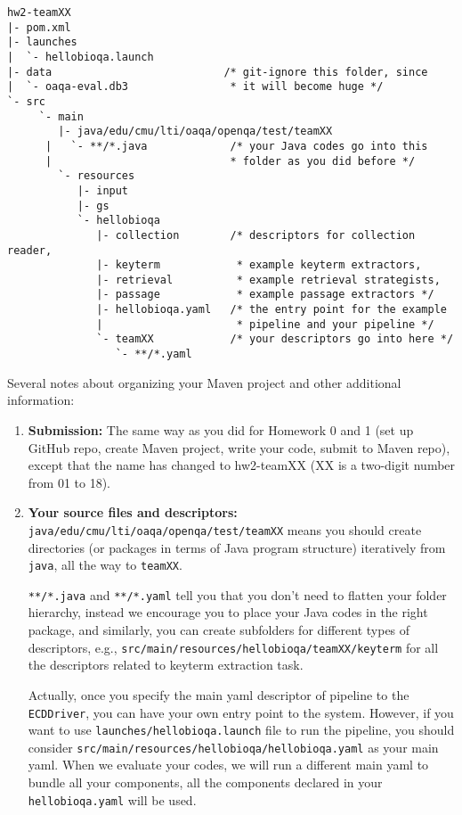 \documentclass[oneside]{memoir}
\begin{document}
\begin{titlingpage}
\begin{minipage}{1.2\textwidth}
\small
\begin{verbatim}
hw2-teamXX
|- pom.xml
|- launches
|  `- hellobioqa.launch
|- data                           /* git-ignore this folder, since
|  `- oaqa-eval.db3                * it will become huge */
`- src
     `- main
        |- java/edu/cmu/lti/oaqa/openqa/test/teamXX
      |   `- **/*.java             /* your Java codes go into this 
      |                            * folder as you did before */
        `- resources
           |- input
           |- gs
           `- hellobioqa
              |- collection        /* descriptors for collection reader,
              |- keyterm            * example keyterm extractors,
              |- retrieval          * example retrieval strategists,
              |- passage            * example passage extractors */
              |- hellobioqa.yaml   /* the entry point for the example 
              |                     * pipeline and your pipeline */
              `- teamXX            /* your descriptors go into here */
                 `- **/*.yaml

\end{verbatim}
\normalsize

Several notes about organizing your Maven project and other additional
information:

\begin{enumerate}

\item \textbf{Submission:} The same way as you did for Homework 0 and 1 (set up
GitHub repo, create Maven project, write your code, submit to Maven repo),
except that the name has changed to hw2-teamXX (XX is a two-digit number from 01
to 18).

\item \textbf{Your source files and descriptors:}
\texttt{java/edu/cmu/lti/oaqa/openqa/test/teamXX} means you should create
directories (or packages in terms of Java program structure) iteratively from
\texttt{java}, all the way to \texttt{teamXX}.

\verb|**/*.java| and \verb|**/*.yaml| tell you that you don't need to flatten
your folder hierarchy, instead we encourage you to place your Java codes in the
right package, and similarly, you can create subfolders for different types of
descriptors, e.g., \verb|src/main/resources/hellobioqa/teamXX/keyterm| for all
the descriptors related to keyterm extraction task.

Actually, once you specify the main yaml descriptor of pipeline to the
\texttt{ECDDriver}, you can have your own entry point to the system. However, if
you want to use \texttt{launches/hellobioqa.launch} file to run the pipeline,
you should consider \texttt{src/main/resources/hellobioqa/hellobioqa.yaml} as
your main yaml. When we evaluate your codes, we will run a different main yaml
to bundle all your components, all the components declared in your
\texttt{hellobioqa.yaml} will be used.


\end{enumerate}
\end{minipage}
\end{titlingpage}
\end{document}
